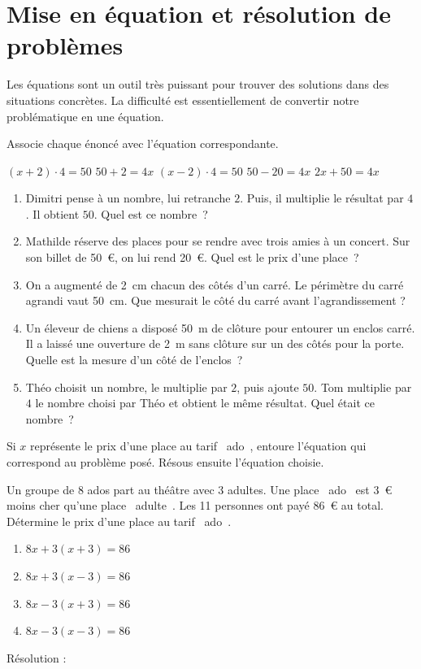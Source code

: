 \documentclass[../../syllabus_2.tex]{subfiles}
\begin{document}
\newpage
\section{Mise en équation et résolution de problèmes}
Les équations sont un outil très puissant pour trouver des solutions dans des situations concrètes. La difficulté est essentiellement de convertir notre problématique en une équation.

\begin{exercise}
  Associe chaque énoncé avec l'équation correspondante.

  $(x+2)\cdot 4 = 50$\hfil
  $50+2=4x$\hfil
  $(x-2)\cdot 4 = 50$\hfil
  $50-20=4x$\hfil
  $2x+50 = 4x$

  \begin{enumerate}
    \item Dimitri pense à un nombre, lui retranche $2$. Puis, il multiplie le résultat par $4$. Il obtient $50$. Quel est ce nombre~? 
    \item Mathilde réserve des places pour se rendre avec trois amies à un concert. Sur son billet de 50~€, on lui rend 20~€. Quel est le prix d'une place~? 
    \item On a augmenté de \SI{2}{cm} chacun des côtés d'un carré. Le périmètre du carré agrandi vaut \SI{50}{cm}. Que mesurait le côté du carré avant l'agrandissement ? 
    \item Un éleveur de chiens a disposé \SI{50}{m} de clôture pour entourer un enclos carré. Il a laissé une ouverture de \SI{2}{m} sans clôture sur un des côtés pour la porte. Quelle est la mesure d'un côté de l'enclos~? 
    \item Théo choisit un nombre, le multiplie par $2$, puis ajoute $50$. Tom multiplie par $4$ le nombre choisi par Théo et obtient le même résultat. Quel était ce nombre~? 
  \end{enumerate}
\end{exercise}

\begin{exercise}
  Si $x$ représente le prix d'une place au tarif \og~ado~\fg{}, entoure l'équation qui correspond au problème posé. Résous ensuite l'équation choisie.

  Un groupe de 8 ados part au théâtre avec 3 adultes. Une place \og~ado~\fg{} est 3~€ moins cher qu'une place \og~adulte~\fg{}. Les 11 personnes ont payé 86~€ au total. Détermine le prix d'une place au tarif \og~ado~\fg{}.
  \begin{enumerate}[cols=2]
    \item $8x+3(x+3)=86$
    \item $8x+3(x-3)=86$
    \item $8x-3(x+3)=86$
    \item $8x-3(x-3)=86$
  \end{enumerate}
  Résolution : \vspace*{5cm}
\end{exercise}
\end{document}

